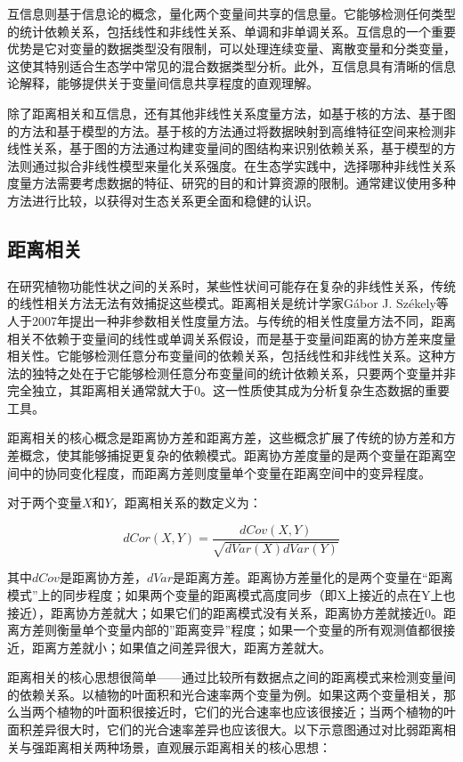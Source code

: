 \documentclass[
  twoside,12pt,fontset=none]{ctexbook}
\begin{document}
互信息则基于信息论的概念，量化两个变量间共享的信息量。它能够检测任何类型的统计依赖关系，包括线性和非线性关系、单调和非单调关系。互信息的一个重要优势是它对变量的数据类型没有限制，可以处理连续变量、离散变量和分类变量，这使其特别适合生态学中常见的混合数据类型分析。此外，互信息具有清晰的信息论解释，能够提供关于变量间信息共享程度的直观理解。

除了距离相关和互信息，还有其他非线性关系度量方法，如基于核的方法、基于图的方法和基于模型的方法。基于核的方法通过将数据映射到高维特征空间来检测非线性关系，基于图的方法通过构建变量间的图结构来识别依赖关系，基于模型的方法则通过拟合非线性模型来量化关系强度。在生态学实践中，选择哪种非线性关系度量方法需要考虑数据的特征、研究的目的和计算资源的限制。通常建议使用多种方法进行比较，以获得对生态关系更全面和稳健的认识。

\hypertarget{ux8dddux79bbux76f8ux5173}{%
\subsection{距离相关}\label{ux8dddux79bbux76f8ux5173}}

在研究植物功能性状之间的关系时，某些性状间可能存在复杂的非线性关系，传统的线性相关方法无法有效捕捉这些模式。距离相关是统计学家Gábor J. Székely等人于2007年提出一种非参数相关性度量方法。与传统的相关性度量方法不同，距离相关不依赖于变量间的线性或单调关系假设，而是基于变量间距离的协方差来度量相关性。它能够检测任意分布变量间的依赖关系，包括线性和非线性关系。这种方法的独特之处在于它能够检测任意分布变量间的统计依赖关系，只要两个变量并非完全独立，其距离相关通常就大于0。这一性质使其成为分析复杂生态数据的重要工具。

距离相关的核心概念是距离协方差和距离方差，这些概念扩展了传统的协方差和方差概念，使其能够捕捉更复杂的依赖模式。距离协方差度量的是两个变量在距离空间中的协同变化程度，而距离方差则度量单个变量在距离空间中的变异程度。

对于两个变量\(X\)和\(Y\)，距离相关系的数定义为：

\[dCor(X,Y) = \frac{dCov(X,Y)}{\sqrt{dVar(X)dVar(Y)}}\]

其中\(dCov\)是距离协方差，\(dVar\)是距离方差。距离协方差量化的是两个变量在``距离模式''上的同步程度；如果两个变量的距离模式高度同步（即X上接近的点在Y上也接近），距离协方差就大；如果它们的距离模式没有关系，距离协方差就接近0。距离方差则衡量单个变量内部的''距离变异''程度；如果一个变量的所有观测值都很接近，距离方差就小；如果值之间差异很大，距离方差就大。

距离相关的核心思想很简单------通过比较所有数据点之间的距离模式来检测变量间的依赖关系。以植物的叶面积和光合速率两个变量为例。如果这两个变量相关，那么当两个植物的叶面积很接近时，它们的光合速率也应该很接近；当两个植物的叶面积差异很大时，它们的光合速率差异也应该很大。以下示意图通过对比弱距离相关与强距离相关两种场景，直观展示距离相关的核心思想：
\end{document}
